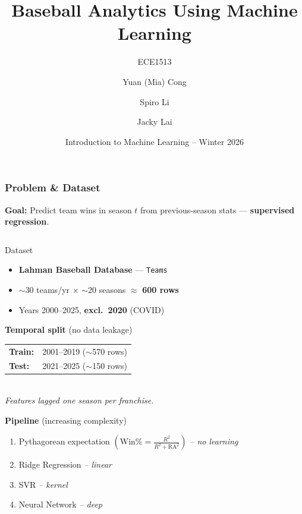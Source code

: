\documentclass{beamer}
\title[Baseball Analytics Using Machine Learning]
{Baseball Analytics Using Machine Learning}
\subtitle{ECE1513}
\author[Mia Cong, Spiro Li, Jacky Lai] 
{Yuan (Mia) Cong\inst{1} \and Spiro Li\inst{2} \and Jacky Lai\inst{3}}
\institute[ ] %
{
  \inst{1}%
  Department of Mechanical \& Industrial Engineering
  \and
  \inst{2}%
  Department of Electrical and Computer Engineering
  \and
   \inst{3}%
  Department of Mechanical \& Industrial Engineering
}
\date[IntroML] %
{Introduction to Machine Learning -- Winter 2026}
\begin{document}
\frame{\titlepage}
\setcounter{framenumber}{0}

\begin{frame}[t]
\frametitle{Problem \& Dataset}

\vspace{-2pt}
{\small\textbf{Goal:} Predict team wins in season $t$ from previous-season stats --- \textbf{supervised regression}.}

\vspace{5pt}
\begin{columns}[T]

\begin{column}{0.47\textwidth}

\begin{block}{\scriptsize Dataset}
\vspace{-4pt}
{\scriptsize
\begin{itemize}
  \setlength{\itemsep}{0pt}
  \item \textbf{Lahman Baseball Database} --- \texttt{Teams}
  \item ${\sim}$30 teams/yr $\times$ ${\sim}$20 seasons $\approx$ \textbf{600 rows}
  \item Years 2000--2025, \textbf{excl.\ 2020} (COVID)
\end{itemize}
}
\vspace{-4pt}
\end{block}

\vspace{2pt}
{\scriptsize\textbf{Temporal split} (no data leakage)}\\[1pt]
{\scriptsize
\begin{tabular}{@{}ll@{}}
  \textbf{Train:} & 2001--2019 (${\sim}$570 rows) \\
  \textbf{Test:}  & 2021--2025 (${\sim}$150 rows) \\
\end{tabular}}\\[1pt]
{\tiny\color{gray}\itshape Features lagged one season per franchise.}

\vspace{5pt}
{\scriptsize\textbf{Pipeline} (increasing complexity)}
\vspace{-1pt}
{\scriptsize
\begin{enumerate}
  \setlength{\itemsep}{2pt}
  \item Pythagorean expectation $\left(\text{Win\%} = \frac{R^2}{R^2 + \text{RA}^2}\right)$ {\color{gray}\itshape-- no learning}
  \item Ridge Regression {\color{gray}\itshape-- linear}
  \item SVR {\color{gray}\itshape-- kernel}
  \item Neural Network {\color{gray}\itshape-- deep}
\end{enumerate}
}


\end{column}
\end{columns}
\end{frame}
\end{document}
